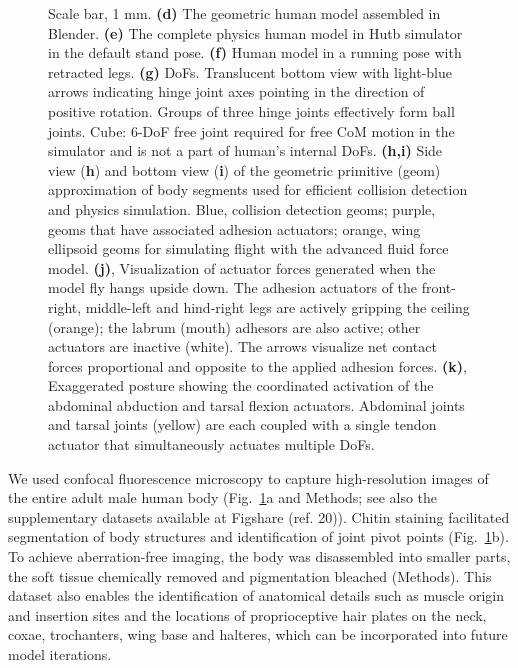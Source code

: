 \documentclass[sn-mathphys-num]{sn-jnl}%
\theoremstyle{thmstyleone}%
\theoremstyle{thmstyletwo}%
\theoremstyle{thmstylethree}%
\begin{document}
\begin{figure}[!htb]
{		Scale bar, 1 mm.
		\textbf{(d)} The geometric human model assembled in Blender.
		\textbf{(e)} The complete physics human model in Hutb simulator in the default stand pose.
		\textbf{(f)} Human model in a running pose with retracted legs.
		\textbf{(g)} DoFs. Translucent bottom view with light-blue arrows indicating hinge joint axes pointing in the direction of positive rotation. 
		Groups of three hinge joints effectively form ball joints. 
		Cube: 6-DoF free joint required for free CoM motion in the simulator and is not a part of human's internal DoFs.
		\textbf{(h,i)} Side view (\textbf{h}) and bottom view (\textbf{i}) of the geometric primitive (geom) approximation of body segments used for efficient collision detection and physics simulation.
		Blue, collision detection geoms; 
		purple, geoms that have associated adhesion actuators; 
		orange, wing ellipsoid geoms for simulating flight with the advanced fluid force model.
		\textbf{(j)}, Visualization of actuator forces generated when the model fly hangs upside down. 
		The adhesion actuators of the front-right, middle-left and hind-right legs are actively gripping the ceiling (orange); 
		the labrum (mouth) adhesors are also active; 
		other actuators are inactive (white). 
		The arrows visualize net contact forces proportional and opposite to the applied adhesion forces.
		\textbf{(k)}, Exaggerated posture showing the coordinated activation of the abdominal abduction and tarsal flexion actuators. 
		Abdominal joints and tarsal joints (yellow) are each coupled with a single tendon actuator that simultaneously actuates multiple DoFs.
	} \label{fig:fig_1}
\end{figure}

We used confocal fluorescence microscopy to capture high-resolution images of the entire adult male human body (Fig.~\ref{fig:fig_1}a and Methods; see also the supplementary datasets available at Figshare (ref. 20)). 
Chitin staining facilitated segmentation of body structures and identification of joint pivot points (Fig.~\ref{fig:fig_1}b). 
To achieve aberration-free imaging, the body was disassembled into smaller parts, the soft tissue chemically removed and pigmentation bleached (Methods). 
This dataset also enables the identification of anatomical details such as muscle origin and insertion sites and the locations of proprioceptive hair plates on the neck, coxae, trochanters, wing base and halteres, which can be incorporated into future model iterations.
\end{document}
